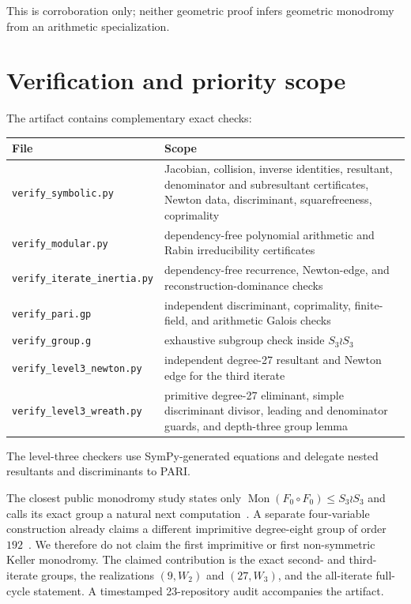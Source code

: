\documentclass[11pt]{article}
\newcommand{\Mon}{\operatorname{Mon}}
\begin{document}
This is corroboration only; neither geometric proof infers geometric
monodromy from an arithmetic specialization.

\section{Verification and priority scope}

The artifact contains complementary exact checks:
\begin{center}
\begin{tabularx}{\textwidth}{@{}lX@{}}
\toprule
File & Scope\\ \midrule
\texttt{verify\_symbolic.py} & Jacobian, collision, inverse identities,
resultant, denominator and subresultant certificates, Newton data,
discriminant, squarefreeness, coprimality\\
\texttt{verify\_modular.py} & dependency-free polynomial arithmetic and Rabin
irreducibility certificates\\
\texttt{verify\_iterate\_inertia.py} & dependency-free recurrence, Newton-edge,
and reconstruction-dominance checks\\
\texttt{verify\_pari.gp} & independent discriminant, coprimality, finite-field,
and arithmetic Galois checks\\
\texttt{verify\_group.g} & exhaustive subgroup check inside $S_3\wr S_3$\\
\texttt{verify\_level3\_newton.py} & independent degree-27 resultant and Newton
edge for the third iterate\\
\texttt{verify\_level3\_wreath.py} & primitive degree-27 eliminant, simple
discriminant divisor, leading and denominator guards, and depth-three group
lemma\\
\bottomrule
\end{tabularx}
\end{center}
The level-three checkers use SymPy-generated equations and delegate nested
resultants and discriminants to PARI.

The closest public monodromy study states only
$\Mon(F_0\circ F_0)\leq S_3\wr S_3$ and calls its exact group a natural next
computation~\cite{weighted}. A separate four-variable construction already
claims a different imprimitive degree-eight group of order $192$~\cite{quartic}.
We therefore do not claim the first imprimitive or first non-symmetric Keller
monodromy. The claimed contribution is the exact second- and third-iterate
groups, the realizations $(9,W_2)$ and $(27,W_3)$, and the all-iterate
full-cycle statement. A timestamped 23-repository audit accompanies the
artifact.
\end{document}
